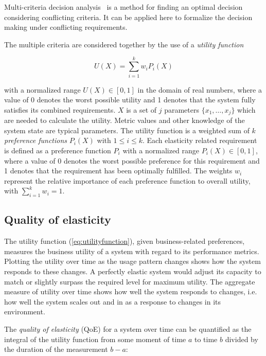 \documentclass[english]{tktltiki2}
\theoremstyle{definition}
\theoremstyle{remark}
\begin{document}
Multi-criteria decision analysis~\cite{Duboc2007}\cite{Ke2012} is a method
for finding an optimal decision considering conflicting criteria. It can be
applied here to formalize the decision making under conflicting requirements.


The multiple criteria are considered together by the use of a \emph{utility
function}

\begin{equation}
U(X) = \sum\limits_{i=1}^k w_{i}P_{i}(X) \label{eq:utilityfunction}
\end{equation}

with a normalized range $U(X) \in [0, 1]$ in the domain of real numbers, where a
value of 0 denotes the worst possible utility and 1 denotes that the system
fully satisfies its combined requirements. $X$ is a set of $j$ parameters
$\{x_{1}, \dots, x_{j}\}$ which are needed to calculate the utility. Metric
values and other knowledge of the system state are typical parameters. The
utility function is a weighted sum of $k$ \emph{preference functions} $P_{i}(X)$
with $1 \le i \le k$. Each elasticity related requirement is defined as a
preference function $P_{i}$ with a normalized range $P_{i}(X) \in [0, 1]$, where
a value of 0 denotes the worst possible preference for this requirement and 1
denotes that the requirement has been optimally fulfilled. The weights $w_{i}$
represent the relative importance of each preference function to overall
utility, with $\sum_{i=1}^k w_{i} = 1$.


\subsection{Quality of elasticity} 

The utility function (\ref{eq:utilityfunction}),
given business-related preferences, measures the business utility of a system
with regard to its performance metrics. Plotting the utility over time as the
usage pattern changes shows how the system responds to these changes. A perfectly
elastic system would adjust its capacity to match or slightly surpass the
required level for maximum utility. The aggregate measure of utility over time
shows how well the system responds to changes, i.e. how well the system scales
out and in as a response to changes in its environment.

The \emph{quality of elasticity} (QoE) for a system over time can be quantified
as the integral of the utility function from some moment of time $a$ to time
$b$ divided by the duration of the measurement $b - a$:
\end{document}
